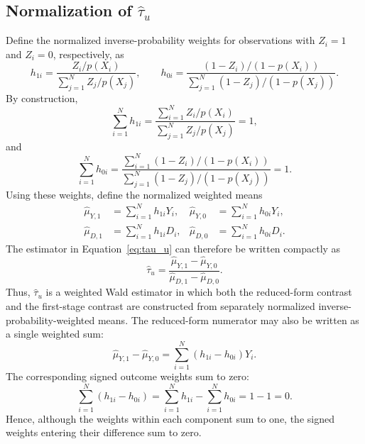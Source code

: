 \documentclass[12pt, a4paper, oneside]{article}
\theoremstyle{plain}
\theoremstyle{definition}
\begin{document}
\subsection{Normalization of \texorpdfstring{$\widehat{\tau}_u$}{tau-u}}
Define the normalized inverse-probability weights for observations with $Z_i=1$ and $Z_i=0$, respectively, as
\begin{equation}
h_{1i}
=
\frac{Z_i/p(X_i)}
{\sum_{j=1}^N Z_j/p(X_j)},
\qquad
h_{0i}
=
\frac{(1-Z_i)/(1-p(X_i))}
{\sum_{j=1}^N (1-Z_j)/(1-p(X_j))}.
\label{eq:hajek_weights}
\end{equation}
By construction,
\begin{equation}
\sum_{i=1}^N h_{1i}
=
\frac{\sum_{i=1}^N Z_i/p(X_i)}
{\sum_{j=1}^N Z_j/p(X_j)}
=1,
\end{equation}
and
\begin{equation}
\sum_{i=1}^N h_{0i}
=
\frac{\sum_{i=1}^N (1-Z_i)/(1-p(X_i))}
{\sum_{j=1}^N (1-Z_j)/(1-p(X_j))}
=1.
\end{equation}
Using these weights, define the normalized weighted means
\begin{align}
\widehat{\mu}_{Y,1}
&=
\sum_{i=1}^N h_{1i}Y_i,
&
\widehat{\mu}_{Y,0}
&=
\sum_{i=1}^N h_{0i}Y_i, \\
\widehat{\mu}_{D,1}
&=
\sum_{i=1}^N h_{1i}D_i,
&
\widehat{\mu}_{D,0}
&=
\sum_{i=1}^N h_{0i}D_i.
\end{align}
The estimator in Equation~\eqref{eq:tau_u} can therefore be written compactly as
\begin{equation}
\widehat{\tau}_u
=
\frac{
\widehat{\mu}_{Y,1}-\widehat{\mu}_{Y,0}
}{
\widehat{\mu}_{D,1}-\widehat{\mu}_{D,0}
}.
\label{eq:tau_u_compact}
\end{equation}
Thus, $\widehat{\tau}_u$ is a weighted Wald estimator in which both the reduced-form contrast and the first-stage contrast are constructed from separately normalized inverse-probability-weighted means.
The reduced-form numerator may also be written as a single weighted sum:
\begin{equation}
\widehat{\mu}_{Y,1}-\widehat{\mu}_{Y,0}
=
\sum_{i=1}^N (h_{1i}-h_{0i})Y_i.
\end{equation}
The corresponding signed outcome weights sum to zero:
\begin{equation}
\sum_{i=1}^N(h_{1i}-h_{0i})
=
\sum_{i=1}^N h_{1i}
-
\sum_{i=1}^N h_{0i}
=
1-1=0.
\label{eq:tau_u_zero_sum}
\end{equation}
Hence, although the weights within each component sum to one, the signed weights entering their difference sum to zero.
\end{document}
